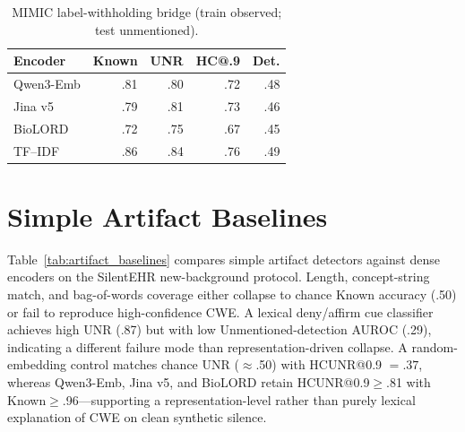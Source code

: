 \documentclass[11pt]{article}
\begin{document}
\begin{table}[!htbp]
  \centering
  \scriptsize
  \renewcommand{\arraystretch}{1.06}
  \caption{MIMIC label-withholding bridge (train observed; test unmentioned).}
  \label{tab:label_withholding}
  \begin{tabular*}{\columnwidth}{@{\extracolsep{\fill}}lrrrr@{}}
    \toprule
    \textbf{Encoder} & \textbf{Known} & \textbf{UNR} &
    \textbf{HC@.9} & \textbf{Det.} \\
    \midrule
    Qwen3-Emb    & .81 & .80 & .72 & .48 \\
    Jina v5      & .79 & .81 & .73 & .46 \\
    BioLORD      & .72 & .75 & .67 & .45 \\
    TF--IDF      & .86 & .84 & .76 & .49 \\
    \bottomrule
  \end{tabular*}
\end{table}

\section{Simple Artifact Baselines}
\label{app:artifact_baselines}

Table~\ref{tab:artifact_baselines} compares simple artifact detectors against
dense encoders on the SilentEHR new-background protocol. Length, concept-string
match, and bag-of-words coverage either collapse to chance Known accuracy
(.50) or fail to reproduce high-confidence CWE. A lexical deny/affirm cue
classifier achieves high UNR (.87) but with low Unmentioned-detection AUROC
(.29), indicating a different failure mode than representation-driven collapse.
A random-embedding control matches chance UNR ($\approx$.50) with HCUNR@0.9
$=.37$, whereas Qwen3-Emb, Jina v5, and BioLORD retain HCUNR@0.9$\geq$.81
with Known$\geq$.96---supporting a representation-level rather than purely
lexical explanation of CWE on clean synthetic silence.
\end{document}
